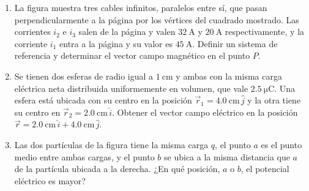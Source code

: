 \documentclass[a4paper,11pt,dvipsnames, twocolumn]{article}
\begin{document}
\begin{enumerate}[wide, labelwidth=!, labelindent=0pt]
\item La figura muestra tres cables infinitos, paralelos entre sí, que pasan perpendicularmente a la página por los vértices del cuadrado mostrado. Las corrientes $i_2$ e $i_3$ salen de la página y valen $\SI{32}{\ampere}$ y $\SI{20}{\ampere}$ respectivamente, y la corriente $i_1$ entra a la página y su valor es $\SI{45}{\ampere}$. Definir un sistema de referencia y determinar el vector campo magnético en el punto $P$.
\begin{center}
\end{center}

\item Se tienen dos esferas de radio igual a $\SI{1}{\centi\metre}$ y ambas con la misma carga eléctrica neta distribuida uniformemente en volumen, que vale $\SI{2.5}{\micro\coulomb}$. Una esfera está ubicada con su centro en la posición $\vec{r}_1 = \SI{4.0}{\centi\metre}\,\hat{j}$ y la otra tiene su centro en $\vec{r}_2 = \SI{2.0}{\centi\metre}\,\hat{i}$. Obtener el vector campo eléctrico en la posición $\vec{r} = \SI{2.0}{\centi\metre}\,\hat{i} +  \SI{4.0}{\centi\metre}\,\hat{j}$.

\vspace*{2cm}

\item Las dos partículas de la figura tiene la misma carga $q$, el punto $a$ es el punto medio entre ambas cargas, y el punto $b$ se ubica a la misma distancia que $a$ de la partícula ubicada a la derecha. ¿En qué posición, $a$ o $b$, el potencial eléctrico es mayor?
\begin{center}
\end{center}



\end{enumerate}
\end{document}
